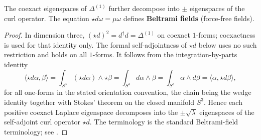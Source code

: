\documentclass[11pt]{article}
\begin{document}
\begin{proposition}

\label{p1a:proposition:atlas-the-coexact-eigenspaces-of-1-further-decompose-59450fa}
The coexact eigenspaces of $\Delta^{(1)}$ further decompose into $\pm$ eigenspaces of the curl operator. The equation $\star d\omega = \mu\omega$ defines \textbf{Beltrami fields} (force-free fields).
\cite{peraltaSalasSlobodeanu2020beltrami,ikedaTaniguchi1978eigenforms}
\end{proposition}

\begin{proof}
In dimension three, \((\star d)^2=d^\dagger d=\Delta^{(1)}\) on coexact
\(1\)-forms; coexactness is used for that identity only.  The formal
self-adjointness of \(\star d\) below uses no such restriction and holds on all
\(1\)-forms.  It follows from the integration-by-parts identity
\[
\langle \star d\alpha,\beta\rangle
=\int_{S^3}(\star d\alpha)\wedge\star\beta
=\int_{S^3}d\alpha\wedge\beta
=\int_{S^3}\alpha\wedge d\beta
=\langle \alpha,\star d\beta\rangle,
\]
for all one-forms in the stated orientation convention, the chain being the wedge identity together with Stokes' theorem on the closed manifold \(S^3\).  Hence each positive coexact Laplace eigenspace decomposes into the \(\pm\sqrt\lambda\) eigenspaces of the self-adjoint curl operator \(\star d\). The terminology is the standard Beltrami-field terminology; see \cite{peraltaSalasSlobodeanu2020beltrami,ikedaTaniguchi1978eigenforms}.
\end{proof}
\end{document}
